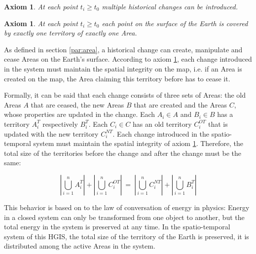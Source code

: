 \vspace{-2.0em}
\newtheorem{historical_change}[assicounter]{Axiom}
\begin{historical_change}
\label{axm:historical_change}
  At each point $t_i \geq t_0$ multiple historical changes can be introduced.
\end{historical_change}

\vspace{-2.0em}
\newtheorem{unique_coverage}[assicounter]{Axiom}
\begin{unique_coverage}
\label{axm:unique_coverage}
  At each point $t_i \geq t_0$ each point on the surface of the Earth is covered by exactly one territory of exactly one Area.
\end{unique_coverage}

As defined in section \ref{par:area}, a historical change can create, manipulate and cease Areas on the Earth's surface. According to axiom \ref{axm:unique_coverage}, each change introduced in the system must maintain the spatial integrity on the map, i.e. if an Area is created on the map, the Area claiming this territory before has to cease it.

Formally, it can be said that each change consists of three sets of Areas: the old Areas $A$ that are ceased, the new Areas $B$ that are created and the Areas $C$, whose properties are updated in the change. Each $A_i \in A$ and $B_i \in B$ has a territory $A_i^T$ respectively $B_i^T$. Each $C_i \in C$ has an old territory $C_i^{OT}$ that is updated with the new territory $C_i^{NT}$. Each change introduced in the spatio-temporal system must maintain the spatial integrity of axiom \ref{axm:unique_coverage}. Therefore, the total size of the territories before the change and after the change must be the same:

\vspace{-.5em}

\[
  \left|\bigcup\limits_{i=1}^n A_i^T\right|
  +
  \left|\bigcup\limits_{i=1}^n C_i^{OT}\right|
  ~=~
  \left|\bigcup\limits_{i=1}^n C_i^{NT}\right|
  +
  \left|\bigcup\limits_{i=1}^n B_i^T\right|
\]

\vspace{.5em}

This behavior is based on to the law of conversation of energy in physics: Energy in a closed system can only be transformed from one object to another, but the total energy in the system is preserved at any time. In the spatio-temporal system of this HGIS, the total size of the territory of the Earth is preserved, it is distributed among the active Areas in the system.

